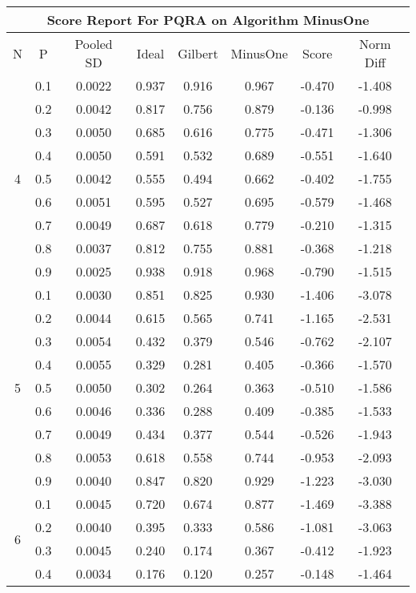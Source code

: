 \documentclass[11pt,a4paper]{report}
\begin{document}
\begin{longtable}{ | c | c || c | c | c | c | c | c | }
\hline
\multicolumn{8}{|c|}{ Score Report For PQRA on Algorithm MinusOne} \\
\hline
N & P & Pooled SD &  Ideal &  Gilbert & MinusOne  & Score & Norm Diff \\
 \hline
 \hline
 \endhead
\multirow{9}{*}{4} & 0.1 & 0.0022 & 0.937 & 0.916 & 0.967 & -0.470 & -1.408 \\
 & 0.2 & 0.0042 & 0.817 & 0.756 & 0.879 & -0.136 & -0.998 \\
 & 0.3 & 0.0050 & 0.685 & 0.616 & 0.775 & -0.471 & -1.306 \\
 & 0.4 & 0.0050 & 0.591 & 0.532 & 0.689 & -0.551 & -1.640 \\
 & 0.5 & 0.0042 & 0.555 & 0.494 & 0.662 & -0.402 & -1.755 \\
 & 0.6 & 0.0051 & 0.595 & 0.527 & 0.695 & -0.579 & -1.468 \\
 & 0.7 & 0.0049 & 0.687 & 0.618 & 0.779 & -0.210 & -1.315 \\
 & 0.8 & 0.0037 & 0.812 & 0.755 & 0.881 & -0.368 & -1.218 \\
 & 0.9 & 0.0025 & 0.938 & 0.918 & 0.968 & -0.790 & -1.515 \\
 \hline
\multirow{9}{*}{5} & 0.1 & 0.0030 & 0.851 & 0.825 & 0.930 & -1.406 & -3.078 \\
 & 0.2 & 0.0044 & 0.615 & 0.565 & 0.741 & -1.165 & -2.531 \\
 & 0.3 & 0.0054 & 0.432 & 0.379 & 0.546 & -0.762 & -2.107 \\
 & 0.4 & 0.0055 & 0.329 & 0.281 & 0.405 & -0.366 & -1.570 \\
 & 0.5 & 0.0050 & 0.302 & 0.264 & 0.363 & -0.510 & -1.586 \\
 & 0.6 & 0.0046 & 0.336 & 0.288 & 0.409 & -0.385 & -1.533 \\
 & 0.7 & 0.0049 & 0.434 & 0.377 & 0.544 & -0.526 & -1.943 \\
 & 0.8 & 0.0053 & 0.618 & 0.558 & 0.744 & -0.953 & -2.093 \\
 & 0.9 & 0.0040 & 0.847 & 0.820 & 0.929 & -1.223 & -3.030 \\
 \hline
\multirow{9}{*}{6} & 0.1 & 0.0045 & 0.720 & 0.674 & 0.877 & -1.469 & -3.388 \\
 & 0.2 & 0.0040 & 0.395 & 0.333 & 0.586 & -1.081 & -3.063 \\
 & 0.3 & 0.0045 & 0.240 & 0.174 & 0.367 & -0.412 & -1.923 \\
 & 0.4 & 0.0034 & 0.176 & 0.120 & 0.257 & -0.148 & -1.464 \\

\end{longtable}
\end{document}
